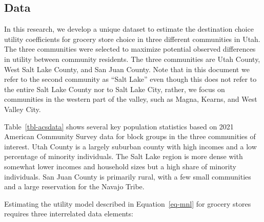 \documentclass[
  letterpaper,
  number,
  review,
  3p]{elsarticle}
\begin{document}
\subsection{Data}\label{data}

In this research, we develop a unique dataset to estimate the
destination choice utility coefficients for grocery store choice in
three different communities in Utah. The three communities were selected
to maximize potential observed differences in utility between community
residents. The three communities are Utah County, West Salt Lake County,
and San Juan County. Note that in this document we refer to the second
community as ``Salt Lake'' even though this does not refer to the entire
Salt Lake County nor to Salt Lake City, rather, we focus on communities
in the western part of the valley, such as Magna, Kearns, and West
Valley City.

Table~\ref{tbl-acsdata} shows several key population statistics based on
2021 American Community Survey data for block groups in the three
communities of interest. Utah County is a largely suburban county with
high incomes and a low percentage of minority individuals. The Salt Lake
region is more dense with somewhat lower incomes and household sizes but
a high share of minority individuals. San Juan County is primarily
rural, with a few small communities and a large reservation for the
Navajo Tribe.

\begin{table}

\caption{\label{tbl-acsdata}Demographic Statistics of Study Region}


\end{table}%

Estimating the utility model described in Equation~\ref{eq-mnl} for
grocery stores requires three interrelated data elements:
\end{document}

